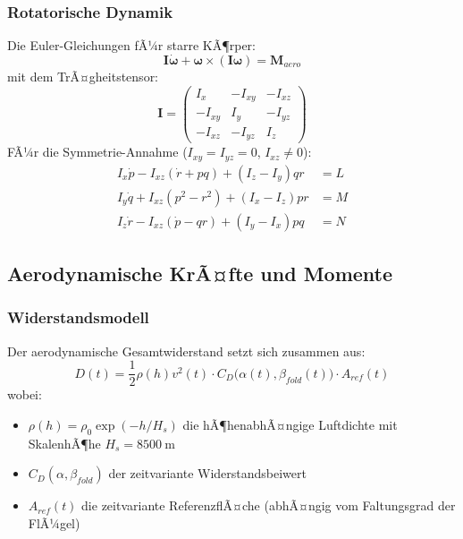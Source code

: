 ﻿\documentclass[12pt,a4paper]{article}
\theoremstyle{remark}
\begin{document}
	\subsubsection{Rotatorische Dynamik}
	
	Die Euler-Gleichungen fÃ¼r starre KÃ¶rper:
	\begin{equation}
		\mathbf{I}\dot{\boldsymbol{\omega}} + \boldsymbol{\omega} \times (\mathbf{I}\boldsymbol{\omega}) = \mathbf{M}_{aero}
		\label{eq:euler_rot}
	\end{equation}
	mit dem TrÃ¤gheitstensor:
	\begin{equation}
		\mathbf{I} = \begin{pmatrix} I_x & -I_{xy} & -I_{xz} \\ -I_{xy} & I_y & -I_{yz} \\ -I_{xz} & -I_{yz} & I_z \end{pmatrix}
	\end{equation}
	FÃ¼r die Symmetrie-Annahme ($I_{xy} = I_{yz} = 0$, $I_{xz} \neq 0$):
	\begin{align}
		I_x \dot{p} - I_{xz}(\dot{r} + pq) + (I_z - I_y)qr &= L \\
		I_y \dot{q} + I_{xz}(p^2 - r^2) + (I_x - I_z)pr &= M \\
		I_z \dot{r} - I_{xz}(\dot{p} - qr) + (I_y - I_x)pq &= N
	\end{align}
	
	\subsection{Aerodynamische KrÃ¤fte und Momente}
	
	\subsubsection{Widerstandsmodell}
	
	Der aerodynamische Gesamtwiderstand setzt sich zusammen aus:
	\begin{equation}
		D(t) = \frac{1}{2}\rho(h) v^2(t) \cdot C_D\bigl(\alpha(t), \beta_{fold}(t)\bigr) \cdot A_{ref}(t)
		\label{eq:drag}
	\end{equation}
	wobei:
	\begin{itemize}
		\item $\rho(h) = \rho_0 \exp(-h/H_s)$ die hÃ¶henabhÃ¤ngige Luftdichte mit SkalenhÃ¶he $H_s = \SI{8500}{\m}$
		\item $C_D(\alpha, \beta_{fold})$ der zeitvariante Widerstandsbeiwert
		\item $A_{ref}(t)$ die zeitvariante ReferenzflÃ¤che (abhÃ¤ngig vom Faltungsgrad der FlÃ¼gel)
	\end{itemize}
	
\end{document}
